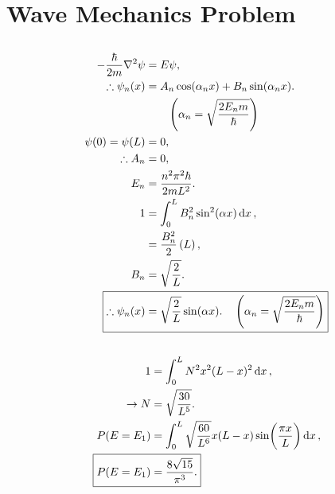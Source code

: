 \documentclass[
a4paper,
10pt,
twoside,
]{article}
\begin{document}
\section{Wave Mechanics Problem}
\subsection{}%
\begin{align}
	-\frac{\hbar}{2m}\laplacian{\psi} &= E\psi,\\
	\therefore \psi_n(x) &= A_n\cos(\alpha_n x) + B_n \sin(\alpha_n x).\\
	&\qquad \left(\alpha_n = \sqrt{\frac{2E_nm}{\hbar}}\right)\\
	\psi(0) = \psi(L) &= 0,\\
	\therefore A_n &= 0,\\
	E_n &= \frac{n^2\pi^2\hbar}{2mL^2}.\\
	1 &= \int_0^L B_n^2\sin[2](\alpha x) \dd{x},\\
	&= \frac{B_n^2}{2}\left(L\right),\\
	B_n &= \sqrt{\frac{2}{L}}.\\
	\Aboxed{\therefore \psi_n(x) &= \sqrt{\frac{2}{L}}\sin(\alpha x). \quad \left(\alpha_n = \sqrt{\frac{2E_nm}{\hbar}}\right)}
\end{align}
\subsection{}%
\begin{align}
	1 &= \int_0^L N^2x^2(L-x)^2 \dd{x},\\
	\rightarrow N &= \sqrt{\frac{30}{L^5}}.\\
	P(E = E_1) &= \int_0^L \sqrt{\frac{60}{L^6}}x(L-x)\sin(\frac{\pi x}{L}) \dd{x},\\
	\Aboxed{P(E = E_1) &= \frac{8\sqrt{15}}{\pi^3}.}
\end{align}
\end{document}
